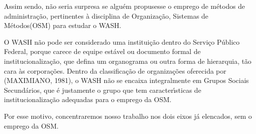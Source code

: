 \documentclass[
12pt,		%
openright,	%
twoside,  %
a4paper,			%
chapter=TITLE,		%
english,			%
french,				%
spanish,			%
brazil				%
]{USPSC-classe/USPSC}
\begin{document}
Assim sendo, n\~ao seria surpresa se algu\'em propusesse o emprego de m\'etodos de administra\c{c}\~ao, pertinentes \`a disciplina de \textquotedbl Organiza\c{c}\~ao, Sistemas de M\'etodos\textquotedbl  (OSM) para estudar o WASH.


















\noindent\begin{center}\mbox{\centering{}}\end{center}


O WASH n\~ao pode ser considerado uma institui\c{c}\~ao dentro do Servi\c{c}o P\'ublico Federal, porque carece de equipe est\'avel ou documento formal de institucionaliza\c{c}\~ao, que defina um organograma ou outra forma de hierarquia, t\~ao cara \`as corpora\c{c}\~oes. Dentro da classifica\c{c}\~ao de organiza\c{c}\~oes oferecida por (MAXIMIANO, 1981), o WASH n\~ao se encaixa integralmente em \textquotedbl Grupos Sociais Secund\'arios\textquotedbl , que \'e justamente o grupo que tem caracter\'{\i}sticas de institucionaliza\c{c}\~ao adequadas para o emprego da OSM.

















Por esse motivo, concentraremos nosso trabalho nos dois eixos j\'a elencados, sem o emprego da OSM.
\end{document}
